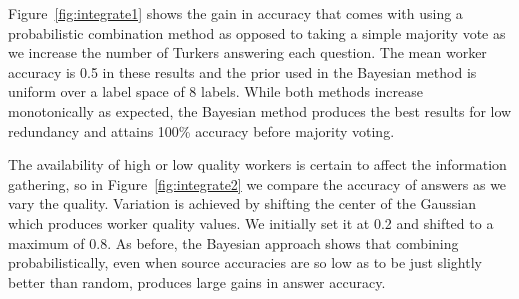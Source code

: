 \eat{
}

Figure~\ref{fig:integrate1} shows the gain in accuracy that comes with using a probabilistic combination method as opposed to taking a simple majority vote as we increase the number of Turkers answering each question.  The mean worker accuracy is 0.5 in these results and the prior used in the Bayesian method is uniform over a label space of 8 labels.  While both methods increase monotonically as expected, the Bayesian method produces the best results for low redundancy and attains 100\% accuracy before majority voting.

The availability of high or low quality workers is certain to affect the information gathering, so in Figure~\ref{fig:integrate2} we compare the accuracy of answers as we vary the quality.  Variation is achieved by shifting the center of the Gaussian which produces worker quality values.  We initially set it at 0.2 and shifted to a maximum of 0.8.  As before, the Bayesian approach shows that combining probabilistically, even when source accuracies are so low as to be just slightly better than random, produces large gains in answer accuracy. 


